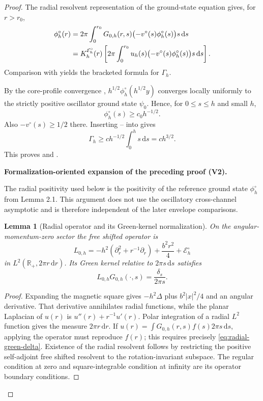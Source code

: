 \documentclass[11pt]{article}
\newtheorem{lemma}[theorem]{Lemma}
\newcommand{\formalisationparentid}{X}
\newenvironment{formalisationaddition}[1]{\par\medskip\begingroup\color{blue}\def\formalisationparentid{#1}\setcounter{formalizationsublemma}{0}\let\lemma\formalizationsublemma\let\endlemma\endformalizationsublemma
  \def\Eo{\mathcal E_h^\circ}\def\EE{\mathcal E_h}\def\phio{\phi_h^\circ}\def\phih{\phi_h}\def\Ho{H_h^{\rm atom}(v^\circ)}\def\Ha{H_h^{\rm atom}}\def\HL{H_h^{L}}\def\Dh{D_h}\def\Log{\operatorname{Log}}\def\ellh{\ell_h}\def\Gp{G_{p,h}}\def\Ast{A_{*,h}}\def\ahat{\widehat{\mathfrak a}_h}\def\ah{\mathfrak a_h}\def\rh{\widehat\rho_h}\def\deltah{\widehat\delta_h}\def\oldref##1{\textup{(##1)}}\def\interface##1{\par\noindent\textit{Analytical interface used here.} ##1\par}\def\finish{\par\noindent\textit{Conclusion of the formalization-oriented expansion.} }\par\noindent\textbf{Formalization-oriented expansion of the preceding proof (V2).}\par\smallskip
}{\par\endgroup\medskip
}
\newcommand{\R}{\mathbb R}
\newcommand{\dd}{\,\mathrm d}
\newcommand{\cE}{\mathcal E}
\begin{document}
\begin{proof}
The radial resolvent representation of the ground-state equation gives, for
$r>r_0$,
\begin{align}
 \phi_h^\circ(r)
 &=2\pi\int_0^{r_0}G_{0,h}(r,s)
 \bigl(-v^\circ(s)\phi_h^\circ(s)\bigr)s\dd s\notag\\
 &=K_h^{\cE_h^\circ}(r)
 \left[2\pi\int_0^{r_0}u_h(s)
 \bigl(-v^\circ(s)\phi_h^\circ(s)\bigr)s\dd s\right].
 \label{eq:Gamma-integral}
\end{align}
Comparison with  yields the bracketed formula for
$\Gamma_h$.

By the core-profile convergence ,
$h^{1/2}\phi_h^\circ(h^{1/2}y)$ converges locally uniformly to the strictly
positive oscillator ground state $\psi_0$.  Hence, for $0\le s\le h$ and small
$h$,
\begin{equation}\label{eq:phi-core-lower}
 \phi_h^\circ(s)\ge c_0h^{-1/2}.
\end{equation}
Also $-v^\circ(s)\ge1/2$ there.  Inserting
-- into
 gives
\[
 \Gamma_h\ge c h^{-1/2}\int_0^h s\dd s=ch^{3/2}.
\]
This proves  and .

\begin{formalisationaddition}{LB.2}
The radial positivity used below is the positivity of the reference ground state $\phio$ from Lemma 2.1. This argument does not use the oscillatory cross-channel asymptotic and is therefore independent of the later envelope comparisons.

\begin{lemma}[Radial operator and its Green-kernel normalization]\label{sublemma:LB-2-radial-green}
On the angular-momentum-zero sector the free shifted operator is
\begin{equation*}
 L_{0,h}=-h^2(\partial_r^2+r^{-1}\partial_r)+\frac{b^2r^2}{4}+\Eo
\end{equation*}
in $L^2(\R_+,2\pi r\,\mathrm dr)$. Its Green kernel relative to $2\pi s\,\mathrm ds$ satisfies
\begin{equation*}
 L_{0,h}G_{0,h}(\cdot,s)=\frac{\delta_s}{2\pi s}.
\end{equation*}
\end{lemma}
\begin{proof}
Expanding the magnetic square gives $-h^2\Delta$ plus $b^2|x|^2/4$ and an angular derivative. That derivative annihilates radial functions, while the planar Laplacian of $u(r)$ is $u''(r)+r^{-1}u'(r)$. Polar integration of a radial $L^2$ function gives the measure $2\pi r\,\mathrm dr$. If $u(r)=\int G_{0,h}(r,s)f(s)2\pi s\,\mathrm ds$, applying the operator must reproduce $f(r)$; this requires precisely \eqref{eq:radial-green-delta}. Existence of the radial resolvent follows by restricting the positive self-adjoint free shifted resolvent to the rotation-invariant subspace. The regular condition at zero and square-integrable condition at infinity are its operator boundary conditions.
\end{proof}


\end{formalisationaddition}
\end{proof}
\end{document}
